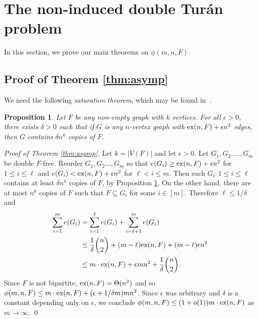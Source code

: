 \documentclass[12pt]{article}
\newtheorem{proposition}[theorem]{Proposition}
\newcommand*{\ex}{\textnormal{ex}}
\begin{document}
\section{The non-induced double Tur\'{a}n problem}

In this section, we prove our main theorems on $\phi(m,n,F)$. 

\subsection{Proof of Theorem \ref{thm:asymp}}

We need the following \textit{saturation theorem}, which may be found in~\cite{ErdosSimonovits1983}.

\begin{proposition}\label{thm:sat}
Let $F$ be any non-empty graph with $k$ vertices.
For all $\epsilon > 0$, there exists $\delta > 0$ such that if $G$ is any $n$-vertex graph with $\ex(n,F) + \epsilon n^2$ edges, then 
$G$ contains $\delta n^k$ copies of $F$. 
\end{proposition}

\textit{Proof of Theorem \ref{thm:asymp}.}
  Let $k = |V(F)|$ and let $\epsilon > 0$. Let $G_1,G_2,\dots,G_m$ be double $F$-free. 
  Reorder $G_1,G_2 \ldots, G_m$ so that 
  $e(G_i) \geq \ex(n,F) + \epsilon n^2$ for $1 \leq i \leq \ell$ and $e(G_i) <\ex(n,F) + \epsilon n^2$ for $\ell < i \leq m$. Then each $G_i : 1 \leq i \leq \ell$ contains at least $\delta n^k$ copies of $F$, by Proposition \ref{thm:sat}. On the other hand, there are at most $n^k$ copies of $F$ 
  such that $F \subseteq G_i$ for some $i \in [m]$. 
  Therefore $\ell \leq 1/\delta$ and
  \begin{align*}
    \sum_{i = 1}^m e(G_i) 
    &= \sum_{i = 1}^{\ell} e(G_i) + \sum_{i =\ell + 1}^m e(G_i) \\
    &\leq \frac{1}{\delta}\binom{n}{2} + (m - \ell)\ex(n,F) + (m - \ell) \epsilon n^2 \\
    &\leq m \cdot \ex(n,F) + \epsilon m n^2 + \frac{1}{\delta}\binom{n}{2}.
  \end{align*}
Since $F$ is not bipartite, $\ex(n,F) = \Theta(n^2)$ and so $\phi(m,n,F) \leq m \cdot \ex(n,F) + (\epsilon + 1/\delta m)mn^2$. Since $\epsilon$ was arbitrary and $\delta$ is a constant depending only on $\epsilon$, 
we conclude $\phi(m,n,F) \leq (1 + o(1))m \cdot \ex(n,F)$ as $m \rightarrow \infty$. \qed
\end{document}
